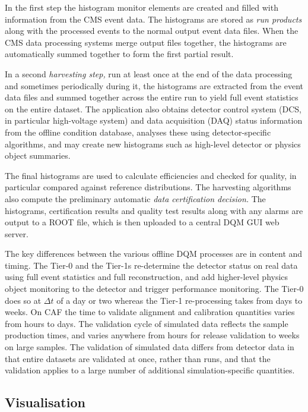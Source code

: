 \documentclass[a4paper]{jpconf}
\begin{document}
In the first step the histogram monitor elements are created and filled with
information from the CMS event data.  The histograms are stored as {\em run
  products} along with the processed events to the normal output event data
files.  When the CMS data processing systems merge output files together, the
histograms are automatically summed together to form the first partial result.

In a second {\em harvesting step,} run at least once at the end of the data
processing and sometimes periodically during it, the histograms are extracted
from the event data files and summed together across the entire run to yield
full event statistics on the entire dataset.  The application also obtains
detector control system (DCS, in particular high-voltage system) and data
acquisition (DAQ) status information from the offline condition database,
analyses these using detector-specific algorithms, and may create new
histograms such as high-level detector or physics object summaries.

The final histograms are used to calculate efficiencies and checked for
quality, in particular compared against reference distributions.  The
harvesting algorithms also compute the preliminary automatic {\em data
  certification decision.}  The histograms, certification results and quality
test results along with any alarms are output to a ROOT file, which is then
uploaded to a central DQM GUI web server.

The key differences between the various offline DQM processes are in content
and timing.  The Tier-0 and the Tier-1s re-determine the detector status on
real data using full event statistics and full reconstruction, and add
higher-level physics object monitoring to the detector and trigger performance
monitoring.  The Tier-0 does so at $\Delta t$ of a day or two whereas the
Tier-1 re-processing takes from days to weeks.  On CAF the time to validate
alignment and calibration quantities varies from hours to days.  The
validation cycle of simulated data reflects the sample production times, and
varies anywhere from hours for release validation to weeks on large samples.
The validation of simulated data differs from detector data in that entire
datasets are validated at once, rather than runs, and that the validation
applies to a large number of additional simulation-specific quantities.

\subsection{Visualisation}
\end{document}
